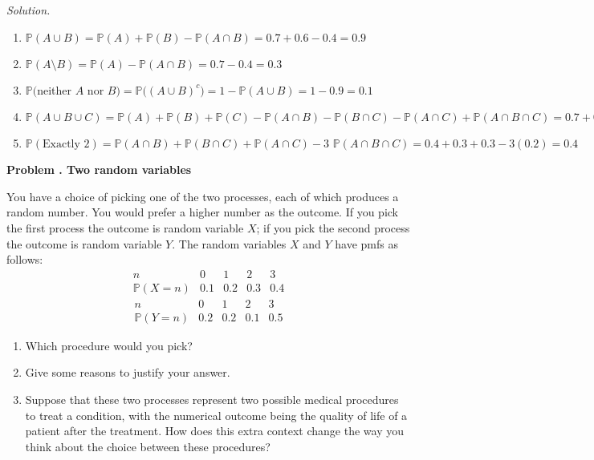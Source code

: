 \documentclass[11pt]{article}
\newcounter{problem}
\newenvironment{problem}[1][]{%
  \refstepcounter{problem}%
  \bigskip\noindent\textbf{Problem \theproblem. #1}\par\smallskip\noindent
}{\bigskip}
\newenvironment{solution}{%
  \noindent\textit{Solution.}\quad
}{\par\bigskip}
\begin{document}
\begin{solution}
\begin{enumerate}
      \item $\mathbb{P}(A\cup B) = \mathbb{P}(A) + \mathbb{P}(B) - \mathbb{P}(A\cap B)
            = 0.7 + 0.6 - 0.4 = 0.9$
      \item $\mathbb{P}(A\setminus B) = \mathbb{P}(A) - \mathbb{P}(A\cap B) 
            = 0.7 - 0.4 = 0.3$
      \item $\mathbb{P}($neither $A$ nor $B$$) = \mathbb{P}\bigl((A\cup B)^{c}\bigr)
            = 1 - \mathbb{P}(A\cup B) = 1 - 0.9 = 0.1$
      \item $\mathbb{P}(A\cup B\cup C) = \mathbb{P}(A) + \mathbb{P}(B) + \mathbb{P}(C)
            - \mathbb{P}(A\cap B) - \mathbb{P}(B\cap C) - \mathbb{P}(A\cap C) + 
            \mathbb{P}(A\cap B\cap C) = 0.7 + 0.6 + 0.5 - 0.4 - 0.3 - 0.3 + 0.2 = 1$
      \item $\mathbb{P}(\text{Exactly } 2) = \mathbb{P}(A\cap B) + \mathbb{P}(B\cap C) + 
            \mathbb{P}(A\cap C) - \text{3 }\mathbb{P}(A\cap B\cap C) = 
            0.4 + 0.3 + 0.3 - 3(0.2) = 0.4$
\end{enumerate}
\end{solution}

\begin{problem}[Two random variables]
You have a choice of picking one of the two processes, each of which produces a random 
number. You would prefer a higher number as the outcome. If you pick the first process 
the outcome is random variable $X$; if you pick the second process the outcome is random 
variable $Y$. The random variables $X$ and $Y$ have pmfs as follows:
\[
\begin{array}{c|cccc}
n      & 0   & 1   & 2   & 3 \\ \hline
\mathbb{P}(X=n) & 0.1 & 0.2 & 0.3 & 0.4
\end{array}
\]
\[
\begin{array}{c|cccc}
n      & 0   & 1   & 2   & 3 \\ \hline
\mathbb{P}(Y=n) & 0.2 & 0.2 & 0.1 & 0.5
\end{array}
\]
\begin{enumerate}
      \item Which procedure would you pick?
      \item Give some reasons to justify your answer.
      \item Suppose that these two processes represent two possible medical procedures 
            to treat a condition, with the numerical outcome being the quality of life 
            of a patient after the treatment. How does this extra context change the 
            way you think about the choice between these procedures?
\end{enumerate}
\end{problem}
\end{document}
